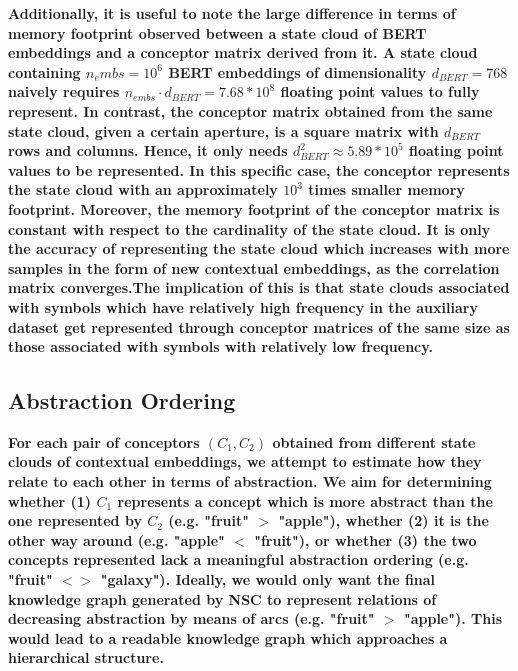\textbf{Additionally, it is useful to note the large difference in terms of memory footprint observed between a state cloud of BERT embeddings and a conceptor matrix derived from it. A state cloud containing $n_embs = 10^6$ BERT embeddings of dimensionality $d_{BERT}=768$ naively requires $n_{embs} \cdot d_{BERT} = 7.68 * 10^8$ floating point values to fully represent. In contrast, the conceptor matrix obtained from the same state cloud, given a certain aperture, is a square matrix with $d_{BERT}$ rows and columns. Hence, it only needs $d_{BERT}^2 \approx 5.89 * 10^5$ floating point values to be represented. In this specific case, the conceptor represents the state cloud with an approximately $10^3$ times smaller memory footprint. Moreover, the memory footprint of the conceptor matrix is constant with respect to the cardinality of the state cloud. It is only the accuracy of representing the state cloud which increases with more samples in the form of new contextual embeddings, as the correlation matrix converges.The implication of this is that state clouds associated with symbols which have relatively high frequency in the auxiliary dataset get represented through conceptor matrices of the same size as those associated with symbols with relatively low frequency.}

\subsection{Abstraction Ordering}

\textbf{For each pair of conceptors $(C_1, C_2)$ obtained from different state clouds of contextual embeddings, we attempt to estimate how they relate to each other in terms of abstraction. We aim for determining whether (1) $C_1$ represents a concept which is more abstract than the one represented by $C_2$ (e.g. "fruit" $>$ "apple"), whether (2) it is the other way around (e.g. "apple" $<$ "fruit"), or whether (3) the two concepts represented lack a meaningful abstraction ordering (e.g. "fruit" $<>$ "galaxy"). Ideally, we would only want the final knowledge graph generated by NSC to represent relations of decreasing abstraction by means of arcs (e.g. "fruit" $>$ "apple"). This would lead to a readable knowledge graph which approaches a hierarchical structure.}

